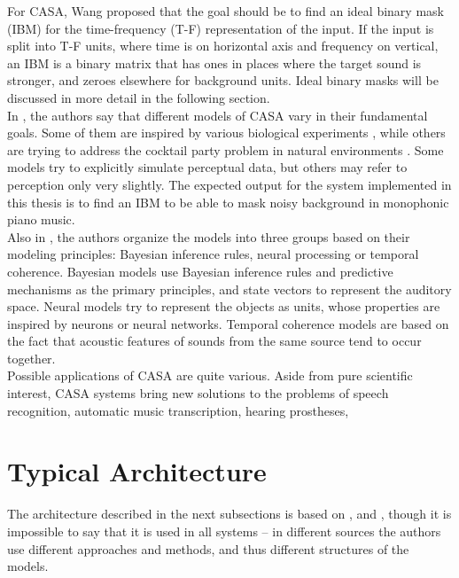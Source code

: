 For CASA, Wang \cite{Wang2006} proposed that the goal should be to find an ideal binary mask (IBM) for the time-frequency (T-F) representation of the input. If the input is split into T-F units, where time is on horizontal axis and frequency on vertical, an IBM is a binary matrix that has ones in places where the target sound is stronger, and zeroes elsewhere for background units. Ideal binary masks will be discussed in more detail in the following section.\\

In \cite{Szabo2016}, the authors say that different models of CASA vary in their fundamental goals. Some of them are inspired by various biological experiments \cite{Wang2008}\cite{Boes2011}, while others are trying to address the cocktail party problem in natural environments \cite{Elhilali2008}. Some models try to explicitly simulate perceptual data, but others may refer to perception only very slightly. The expected output for the system implemented in this thesis is to find an IBM to be able to mask noisy background in monophonic piano music.\\

Also in \cite{Szabo2016}, the authors organize the models into three groups based on their modeling principles: Bayesian inference rules, neural processing or temporal coherence. Bayesian models use Bayesian inference rules and predictive mechanisms as the primary principles, and state vectors to represent the auditory space. Neural models try to represent the objects as units, whose properties are inspired by neurons or neural networks. Temporal coherence models are based on the fact that acoustic features of sounds from the same source tend to occur together.\\

Possible applications of CASA are quite various. Aside from pure scientific interest, CASA systems bring new solutions to the problems of speech recognition, automatic music transcription, hearing prostheses, 

\section{Typical Architecture}

The architecture described in the next subsections is based on \cite{Wang2006}, \cite{Jasti2020} and \cite{Virtanen2012}, though it is impossible to say that it is used in all systems -- in different sources the authors use different approaches and methods, and thus different structures of the models.

